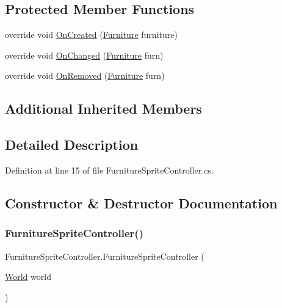 \subsection*{Protected Member Functions}
\begin{DoxyCompactItemize}
\item 
override void \hyperlink{class_furniture_sprite_controller_a367e0a010fd96ee8b27ad49ab5e06bdd}{On\+Created} (\hyperlink{class_furniture}{Furniture} furniture)
\item 
override void \hyperlink{class_furniture_sprite_controller_a5c15b1c219b1b563cd1d5e57e6f7c09e}{On\+Changed} (\hyperlink{class_furniture}{Furniture} furn)
\item 
override void \hyperlink{class_furniture_sprite_controller_ae52dfd105397631a99bd6454282a91a7}{On\+Removed} (\hyperlink{class_furniture}{Furniture} furn)
\end{DoxyCompactItemize}
\subsection*{Additional Inherited Members}


\subsection{Detailed Description}


Definition at line 15 of file Furniture\+Sprite\+Controller.\+cs.



\subsection{Constructor \& Destructor Documentation}
\mbox{\label{class_furniture_sprite_controller_ac5618a43ab627524a3f8dc8ca6516c27}} 
\subsubsection{\texorpdfstring{Furniture\+Sprite\+Controller()}{FurnitureSpriteController()}}
{\footnotesize\ttfamily Furniture\+Sprite\+Controller.\+Furniture\+Sprite\+Controller (\begin{DoxyParamCaption}\item[{\hyperlink{class_world}{World}}]{world }\end{DoxyParamCaption})}



